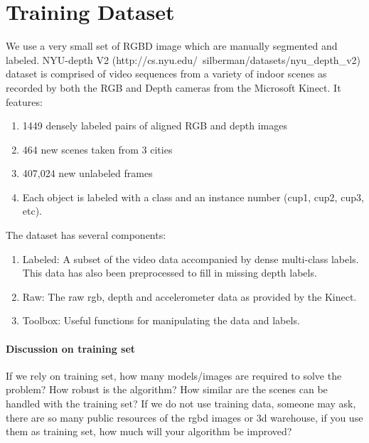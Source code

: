 \section{Training Dataset}
\label{sec:trainingset}

We use a very small set of RGBD image which are manually segmented and labeled. 
NYU-depth V2 (http://cs.nyu.edu/~silberman/datasets/nyu_depth_v2) dataset is comprised of video sequences from a variety of indoor scenes as recorded by both the RGB and Depth cameras from the Microsoft Kinect. 
It features: 
\begin{enumerate}
	\item 1449 densely labeled pairs of aligned RGB and depth images
	\item 464 new scenes taken from 3 cities
	\item 407,024 new unlabeled frames
	\item Each object is labeled with a class and an instance number (cup1, cup2, cup3, etc).
\end{enumerate}

The dataset has several components:
\begin{enumerate}
	\item Labeled: A subset of the video data accompanied by dense multi-class labels. This data has also been preprocessed to fill in missing depth labels.
	\item Raw: The raw rgb, depth and accelerometer data as provided by the Kinect.
	\item Toolbox: Useful functions for manipulating the data and labels.
\end{enumerate}

\paragraph{Discussion on training set} If we rely on training set, how many models/images are required to solve the problem? How robust is the algorithm? How similar are the scenes can be handled with the training set? If we do not use training data, someone may ask, there are so many public resources of the rgbd images or 3d warehouse, if you use them as training set, how much will your algorithm be improved? 

 